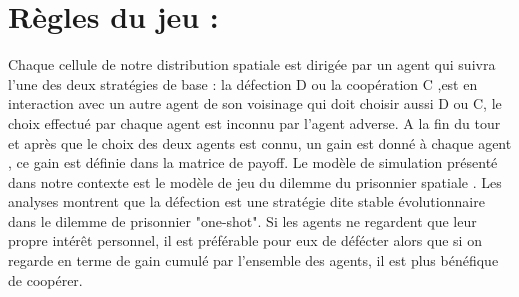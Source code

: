 \documentclass[30pt]{report}
\begin{document}
\section{Règles du jeu :}
Chaque cellule de notre distribution spatiale est dirigée par un agent qui suivra l'une des deux stratégies de base : la défection D ou la coopération C ,est en interaction avec un autre agent de son voisinage qui doit choisir aussi D ou C, le choix effectué par chaque agent est inconnu par l'agent adverse. A la fin du tour et après que le choix des deux agents est connu, un gain  est donné à chaque agent , ce gain est définie dans la matrice de payoff.
	\newline
	\newline
	Le modèle de simulation présenté dans notre contexte est le modèle de jeu du dilemme du prisonnier spatiale .
	\newline
	\newline
	Les analyses montrent que la défection est une stratégie dite stable évolutionnaire dans le dilemme de prisonnier "one-shot".
	\newline
	\newline
	Si les agents ne regardent que leur propre intérêt personnel, il est préférable pour eux de défécter alors que si on regarde en terme de gain cumulé par l'ensemble des agents, il est plus bénéfique de coopérer. 
	\newline
\end{document}
